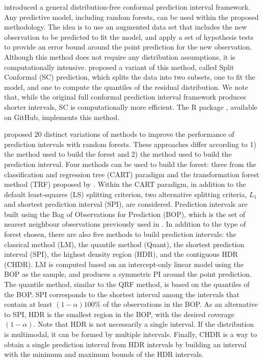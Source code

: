 \citet{vovk_algorithmic_2005,vovk_-line_2009} introduced a general distribution-free conformal prediction interval framework. Any predictive model, including random forests, can be used within the proposed methodology. The idea is to use an augmented data set that includes the new observation to be predicted to fit the model, and apply a set of hypothesis tests to provide an error bound around the point prediction for the new observation. Although this method does not require any distribution assumptions, it is computationally intensive. \citet{lei_distribution-free_2018} proposed a variant of this method, called Split Conformal (SC) prediction, which splits the data into two subsets, one to fit the model, and one to compute the quantiles of the residual distribution. We note that, while the original full conformal prediction interval framework produces shorter intervals, SC is computationally more efficient. The R package  \citep{R-conformalInference}, available on GitHub, implements this method.

\citet{roy_prediction_2020} proposed 20 distinct variations of methods to improve the performance of prediction intervals with random forests. These approaches differ according to 1) the method used to build the forest and 2) the method used to build the prediction interval. Four methods can be used to build the forest: three from the classification and regression tree (CART) paradigm \citep{breiman_classification_1984} and the transformation forest method (TRF) proposed by \cite{hothorn_predictive_2021}. Within the CART paradigm, in addition to the default least-squares (LS) splitting criterion, two alternative splitting criteria, $L_1$ and shortest prediction interval (SPI), are considered. Prediction intervals are built using the Bag of Observations for Prediction (BOP), which is the set of nearest neighbour observations previously used in \citet{moradian_l1_2017,moradian_survival_2019}. In addition to the type of forest chosen, there are also five methods to build prediction intervals: the classical method (LM), the quantile method (Quant), the shortest prediction interval (SPI), the highest density region (HDR), and the contiguous HDR (CHDR). LM is computed based on an intercept-only linear model using the BOP as the sample, and produces a symmetric PI around the point prediction. The quantile method, similar to the QRF method, is based on the quantiles of the BOP. SPI corresponds to the shortest interval among the intervals that contain at least $\left(1-\alpha\right)100\%$ of the observations in the BOP. As an alternative to SPI, HDR is the smallest region in the BOP, with the desired coverage $\left(1-\alpha\right)$. Note that HDR is not necessarily a single interval. If the distribution is multimodal, it can be formed by multiple intervals. Finally, CHDR is a way to obtain a single prediction interval from HDR intervals by building an interval with the minimum and maximum bounds of the HDR intervals. 

